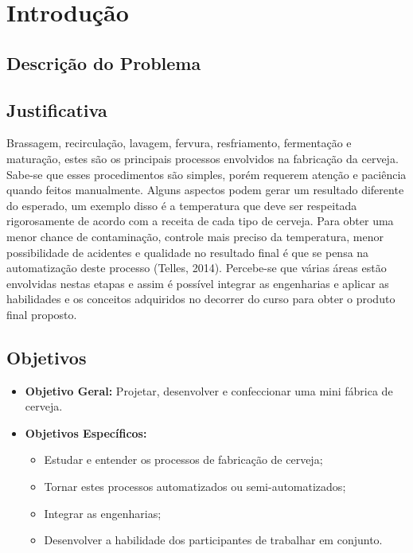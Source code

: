 \section{Introdução}
    \subsection{Descrição do Problema}

    \subsection{Justificativa}
    Brassagem, recirculação, lavagem, fervura, resfriamento, fermentação e maturação, estes são os principais processos envolvidos na fabricação da cerveja. Sabe-se que esses procedimentos são simples, porém requerem atenção e paciência quando feitos manualmente. Alguns aspectos podem gerar um resultado diferente do esperado, um exemplo disso é a temperatura que deve ser respeitada rigorosamente de acordo com a receita de cada tipo de cerveja. Para obter uma menor chance de contaminação, controle mais preciso da temperatura, menor possibilidade de acidentes e qualidade no resultado final é que se pensa na automatização deste processo (Telles, 2014).  Percebe-se que várias áreas estão envolvidas nestas etapas e assim é possível integrar as engenharias e aplicar as habilidades e os conceitos adquiridos no decorrer do curso para obter o produto final proposto.

    \subsection{Objetivos}

    \begin{itemize}
        \item \textbf{Objetivo Geral:} Projetar, desenvolver e confeccionar uma mini fábrica de cerveja.
        \item \textbf{Objetivos Específicos:}
        \begin{itemize}
            \item Estudar e entender os processos de fabricação de cerveja;
            \item Tornar estes processos automatizados ou semi-automatizados;
            \item Integrar as engenharias;
            \item Desenvolver a habilidade dos participantes de trabalhar em conjunto.
        \end{itemize}
    \end{itemize}
